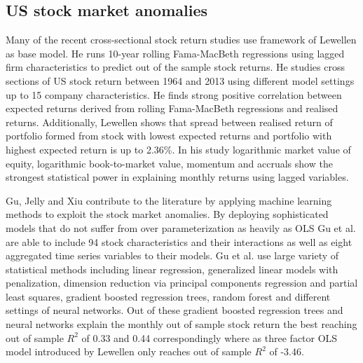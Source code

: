 \documentclass{article}
\begin{document}
\subsection{US stock market anomalies}\label{USStockMarketAnomalies}

Many of the recent cross-sectional stock return studies use framework of Lewellen \citeyear{Lewellen2015} as base model. He runs 10-year rolling Fama-MacBeth regressions using lagged firm characteristics to predict out of the sample stock returns. He studies cross sections of US stock return between 1964 and 2013 using different model settings up to 15 company characteristics. He finds strong positive correlation between expected returns derived from rolling Fama-MacBeth regressions and realised returns. Additionally, Lewellen shows that spread between realised return of portfolio formed from stock with lowest expected returns and portfolio with highest expected return is up to 2.36\%. In his study logarithmic market value of equity, logarithmic book-to-market value, momentum and accruals show the strongest statistical power in explaining monthly returns using lagged variables. \par

Gu, Jelly and Xiu \citeyear{guetal} contribute to the literature by applying machine learning methods to exploit the stock market anomalies. By deploying sophisticated models that do not suffer from over parameterization as heavily as OLS Gu et al. are able to include 94 stock characteristics and their interactions as well as eight aggregated time series variables to their models. Gu et al. use large variety of statistical methods including linear regression, generalized linear models with penalization, dimension reduction via principal components regression and partial least squares, gradient boosted regression trees, random forest and different settings of neural networks. Out of these gradient boosted regression trees and neural networks \footnotemark explain the monthly out of sample stock return the best reaching out of sample $R^{2}$ of 0.33 and 0.44 correspondingly where as three factor OLS model introduced by Lewellen \citeyear{Lewellen2015} only reaches out of sample $R^{2}$ of -3.46. \par

\end{document}
